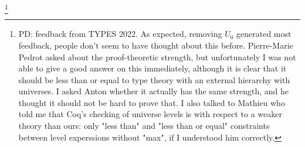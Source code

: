 \documentclass[11pt,a4paper]{article}
\theoremstyle{definition}
\begin{document}
\footnote{PD: feedback from TYPES 2022. As expected, removing $U_0$ generated most feedback, people don't seem to have thought about this before. Pierre-Marie Pedrot asked about the proof-theoretic strength, but unfortunately I was not able to give a good answer on this immediately, although it is clear that it should be less than or equal to type theory with an external hierarchy with universes. I asked Anton whether it actually has the same strength, and he thought it should not be hard to prove that. I also talked to Mathieu who told me that Coq's checking of universe levels is with respect to a weaker theory than ours: only "less than" and "less than or equal" constraints between level experssions without "max", if I understood him correctly.}
\end{document}

